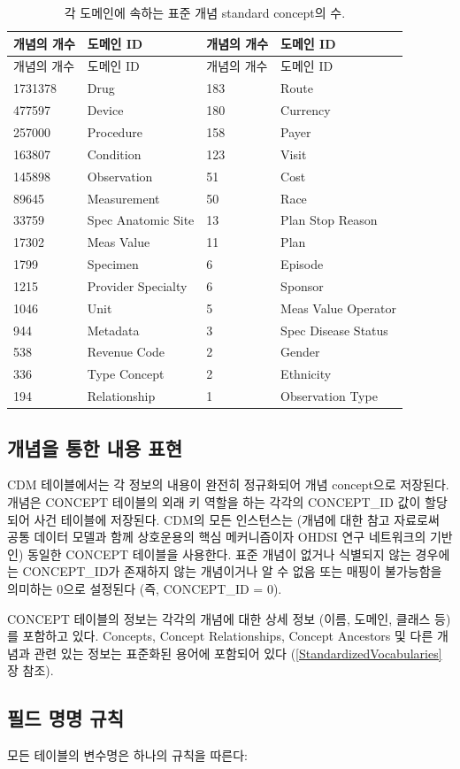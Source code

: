 \documentclass[10.5pt]{book}
\theoremstyle{definition}
\theoremstyle{definition}
\theoremstyle{definition}
\theoremstyle{remark}
\begin{document}
\begin{longtable}[]{@{}llll@{}}
\caption{\label{tab:domains} 각 도메인에 속하는 표준 개념 standard concept의
수.}\tabularnewline
\toprule
개념의 개수 & 도메인 ID & 개념의 개수 & 도메인 ID\tabularnewline
\midrule
\endfirsthead
\toprule
개념의 개수 & 도메인 ID & 개념의 개수 & 도메인 ID\tabularnewline
\midrule
\endhead
1731378 & Drug & 183 & Route\tabularnewline
477597 & Device & 180 & Currency\tabularnewline
257000 & Procedure & 158 & Payer\tabularnewline
163807 & Condition & 123 & Visit\tabularnewline
145898 & Observation & 51 & Cost\tabularnewline
89645 & Measurement & 50 & Race\tabularnewline
33759 & Spec Anatomic Site & 13 & Plan Stop Reason\tabularnewline
17302 & Meas Value & 11 & Plan\tabularnewline
1799 & Specimen & 6 & Episode\tabularnewline
1215 & Provider Specialty & 6 & Sponsor\tabularnewline
1046 & Unit & 5 & Meas Value Operator\tabularnewline
944 & Metadata & 3 & Spec Disease Status\tabularnewline
538 & Revenue Code & 2 & Gender\tabularnewline
336 & Type Concept & 2 & Ethnicity\tabularnewline
194 & Relationship & 1 & Observation Type\tabularnewline
\bottomrule
\end{longtable}

\subsection{개념을 통한 내용 표현}\label{---}

CDM 테이블에서는 각 정보의 내용이 완전히 정규화되어 개념 concept으로
저장된다. 개념은 CONCEPT 테이블의 외래 키 역할을 하는 각각의 CONCEPT\_ID
값이 할당되어 사건 테이블에 저장된다. CDM의 모든 인스턴스는 (개념에 대한
참고 자료로써 공통 데이터 모델과 함께 상호운용의 핵심 메커니즘이자 OHDSI
연구 네트워크의 기반인) 동일한 CONCEPT 테이블을 사용한다. 표준 개념이
없거나 식별되지 않는 경우에는 CONCEPT\_ID가 존재하지 않는 개념이거나 알
수 없음 또는 매핑이 불가능함을 의미하는 0으로 설정된다 (즉, CONCEPT\_ID
= 0).

CONCEPT 테이블의 정보는 각각의 개념에 대한 상세 정보 (이름, 도메인,
클래스 등)를 포함하고 있다. Concepts, Concept Relationships, Concept
Ancestors 및 다른 개념과 관련 있는 정보는 표준화된 용어에 포함되어 있다
(\ref{StandardizedVocabularies}장 참조).

\subsection{필드 명명 규칙}\label{--}

모든 테이블의 변수명은 하나의 규칙을 따른다:
\end{document}
